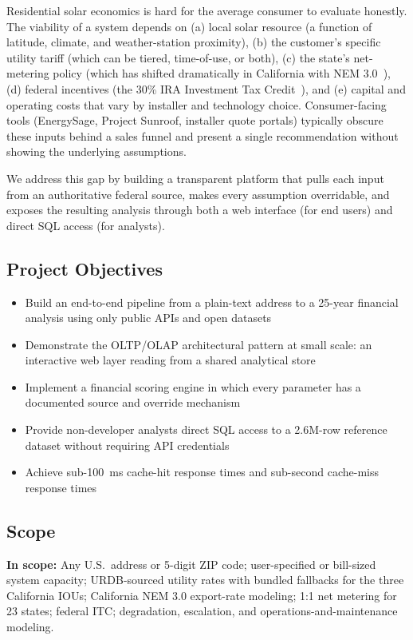 \documentclass[10pt, conference]{IEEEtran}
\begin{document}
Residential solar economics is hard for the average consumer to evaluate honestly. The viability of a system depends on (a) local solar resource (a function of latitude, climate, and weather-station proximity), (b) the customer's specific utility tariff (which can be tiered, time-of-use, or both), (c) the state's net-metering policy (which has shifted dramatically in California with NEM 3.0~\cite{CPUC2023}), (d) federal incentives (the 30\% IRA Investment Tax Credit~\cite{IRA2022}), and (e) capital and operating costs that vary by installer and technology choice. Consumer-facing tools (EnergySage, Project Sunroof, installer quote portals) typically obscure these inputs behind a sales funnel and present a single recommendation without showing the underlying assumptions.

We address this gap by building a transparent platform that pulls each input from an authoritative federal source, makes every assumption overridable, and exposes the resulting analysis through both a web interface (for end users) and direct SQL access (for analysts).

\subsection{Project Objectives}

\begin{itemize}
\item Build an end-to-end pipeline from a plain-text address to a 25-year financial analysis using only public APIs and open datasets
\item Demonstrate the OLTP/OLAP architectural pattern at small scale: an interactive web layer reading from a shared analytical store
\item Implement a financial scoring engine in which every parameter has a documented source and override mechanism
\item Provide non-developer analysts direct SQL access to a 2.6M-row reference dataset without requiring API credentials
\item Achieve sub-100~ms cache-hit response times and sub-second cache-miss response times
\end{itemize}

\subsection{Scope}

\textbf{In scope:} Any U.S.\ address or 5-digit ZIP code; user-specified or bill-sized system capacity; URDB-sourced utility rates with bundled fallbacks for the three California IOUs; California NEM 3.0 export-rate modeling; 1:1 net metering for 23 states; federal ITC; degradation, escalation, and operations-and-maintenance modeling.
\end{document}
